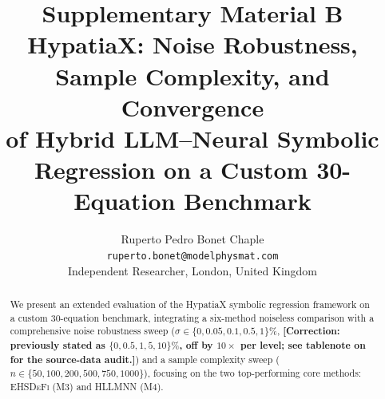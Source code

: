 \documentclass[twoside,11pt]{article}
\newcommand{\EHD}{\textsc{EHSDeFi}}
\newcommand{\HSL}{\textsc{HLLMNN}}
\begin{document}
\title{%
  Supplementary Material B\\[6pt]
  HypatiaX: Noise Robustness, Sample Complexity, and Convergence\\
  of Hybrid LLM--Neural Symbolic Regression on a Custom 30-Equation Benchmark
}
\author{Ruperto Pedro Bonet Chaple\\
  \texttt{ruperto.bonet@modelphysmat.com}\\
  Independent Researcher, London, United Kingdom
}
\editor{}
\maketitle

\begin{abstract}
We present an extended evaluation of the HypatiaX symbolic regression
framework on a custom 30-equation benchmark, integrating a six-method
noiseless comparison with a comprehensive noise robustness sweep
($\sigma \in \{0, 0.05, 0.1, 0.5, 1\}\%$, \textbf{[Correction: previously
stated as $\{0, 0.5, 1, 5, 10\}\%$, off by $10\times$ per level; see
tablenote on  for the source-data audit.]}) and a
sample complexity sweep
($n \in \{50, 100, 200, 500, 750, 1000\}$), focusing on the two
top-performing core methods: \EHD{} (M3) and \HSL{} (M4).


\end{abstract}
\end{document}
